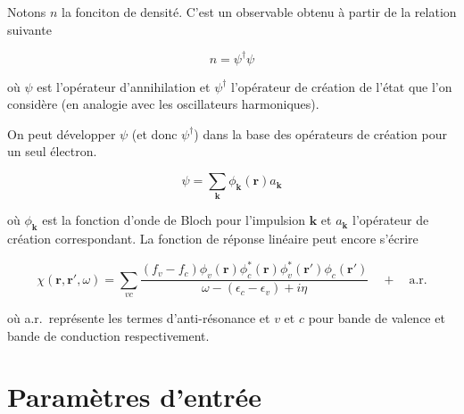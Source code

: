\documentclass[12pt, french]{report}
\theoremstyle{theoreme}
\begin{document}
Notons $n$ la fonciton de densité. C'est un observable obtenu à partir de la relation suivante

$$
n = \psi^\dagger \psi
$$

où $\psi$ est l'opérateur d'annihilation et $\psi^\dagger$ l'opérateur de création de l'état que l'on considère (en analogie avec les oscillateurs harmoniques).

On peut développer $\psi$ (et donc $\psi^\dagger$) dans la base des opérateurs de création
pour un seul électron.

$$
\psi = \sum_\textbf{k} \phi_\textbf{k}(\textbf{r}) a_\textbf{k}
$$

où $\phi_\textbf{k}$ est la fonction d'onde de Bloch pour l'impulsion $\textbf{k}$ et $a_\textbf{k}$ l'opérateur de création correspondant. La fonction de réponse linéaire peut encore s'écrire

\begin{equation}\label{chi}
  \chi(\textbf{r}, \textbf{r}', \omega) = \sum_{vc} \frac{(f_v - f_c)\phi_v(\textbf{r}) \phi_c^*(\textbf{r}) \phi_v^*(\textbf{r}') \phi_c(\textbf{r}')}{\omega - (\epsilon_c - \epsilon_v) + i\eta} \quad + \quad \text{a.r.}
\end{equation}

où a.r.\ représente les termes d'anti-résonance et $v$ et $c$ pour bande de valence et bande de conduction respectivement.

\chapter{Paramètres d'entrée}
\end{document}
